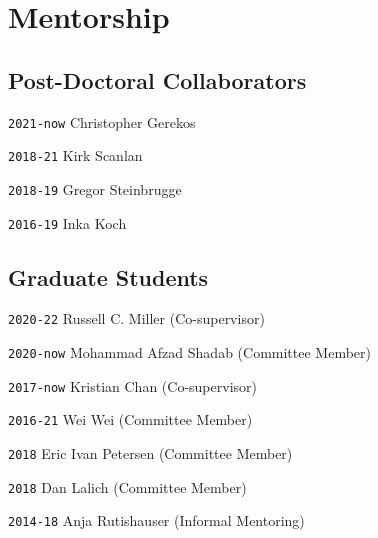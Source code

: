 \section*{Mentorship}

\TabPositions{6em,20em,28em}

\subsection*{Post-Doctoral Collaborators}

\noindent \texttt{2021-now} \tab Christopher Gerekos 

\noindent \texttt{2018-21} \tab Kirk Scanlan 

\noindent \texttt{2018-19} \tab Gregor Steinbrugge

\noindent \texttt{2016-19} \tab Inka Koch

\vspace{-1em}
\subsection*{Graduate Students}

\noindent \texttt{2020-22} \tab Russell C. Miller \tab [MS] \tab (Co-supervisor)

\noindent \texttt{2020-now} \tab Mohammad Afzad Shadab \tab [PhD] \tab (Committee Member)

\noindent \texttt{2017-now} \tab Kristian Chan \tab [PhD] \tab (Co-supervisor)

\noindent \texttt{2016-21} \tab Wei Wei \tab [PhD] \tab (Committee Member)

\noindent \texttt{2018} \tab Eric Ivan Petersen  \tab [PhD] \tab (Committee Member)

\noindent \texttt{2018} \tab Dan Lalich \tab [PhD] \tab (Committee Member)

\noindent \texttt{2014-18} \tab Anja Rutishauser  \tab (Informal Mentoring)

